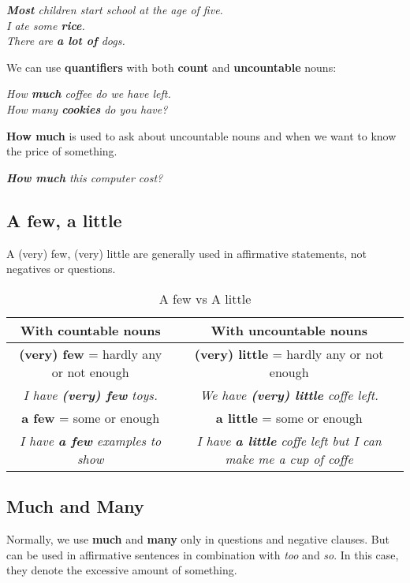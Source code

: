 \documentclass[hidelinks,10pt,a4paper]{article}
\begin{document}
\begin{center}
	\textit{ \textbf{Most} children start school at the age of five. \\
		I ate some \textbf{rice}. \\
		There are \textbf{a lot of} dogs. }
\end{center}

We can use \textbf{quantifiers} with both \textbf{count} and \textbf{uncountable} nouns:
 \begin{center}
 	\textit{How \textbf{much} coffee do we have left. \\
	 		How many \textbf{cookies}  do you have?}
 \end{center}

\textbf{How much} is used to ask about uncountable nouns and when we want to know the price of something.
\begin{center}
	\textit{ \textbf{How much} this computer cost? }
\end{center}

\subsection{A few, a little}
A (very) few, (very) little are generally used in affirmative statements, not negatives or questions.
\begin{table}[h]
	\begin{center}
	\begin{tabular}{|c|c|}
		\hline
		\textbf{With countable nouns} & \textbf{With uncountable nouns} \\ \hline
		\textbf{(very) few} = hardly any or not enough & \textbf{(very) little} = hardly any or not enough \\ \hline
		\textit{I have \textbf{(very) few} toys.} & \textit{We have \textbf{(very) little} coffe left. } \\ \hline
		\textbf{a few} = some or enough & \textbf{a little} = some or enough \\ \hline
		\textit{I have \textbf{a few} examples to show } & \textit{I have \textbf{a little} coffe left but I can make me a cup of coffe } \\ \hline
	\end{tabular}
\end{center}
\caption{\label{tab:quantifiers1}A few vs A little}
\end{table}

\subsection{Much and Many}
Normally, we use \textbf{much} and \textbf{many} only in questions and negative clauses. But can be used in affirmative sentences in combination with \textit{too} and \textit{so}. In this case, they denote the excessive amount of something.
\end{document}

